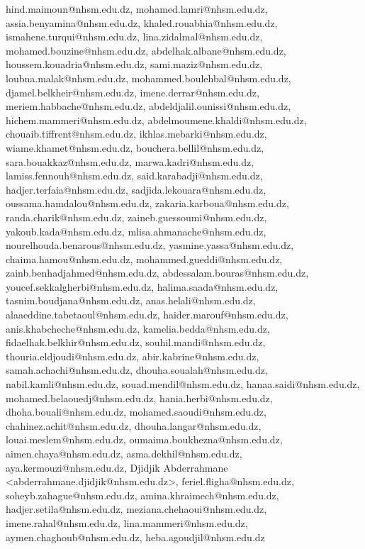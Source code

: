 hind.maimoun@nhsm.edu.dz,
mohamed.lamri@nhsm.edu.dz,
assia.benyamina@nhsm.edu.dz,
khaled.rouabhia@nhsm.edu.dz,
ismahene.turqui@nhsm.edu.dz,
lina.zidalmal@nhsm.edu.dz,
mohamed.bouzine@nhsm.edu.dz,
abdelhak.albane@nhsm.edu.dz,
houssem.kouadria@nhsm.edu.dz,
sami.maziz@nhsm.edu.dz,
loubna.malak@nhsm.edu.dz,
mohammed.boulehbal@nhsm.edu.dz,
djamel.belkheir@nhsm.edu.dz,
imene.derrar@nhsm.edu.dz,
meriem.habbache@nhsm.edu.dz,
abdeldjalil.ounissi@nhsm.edu.dz,
hichem.mammeri@nhsm.edu.dz,
abdelmoumene.khaldi@nhsm.edu.dz,
chouaib.tiffrent@nhsm.edu.dz,
ikhlas.mebarki@nhsm.edu.dz,
wiame.khamet@nhsm.edu.dz,
bouchera.bellil@nhsm.edu.dz,
sara.bouakkaz@nhsm.edu.dz,
marwa.kadri@nhsm.edu.dz,
lamiss.fennouh@nhsm.edu.dz,
said.karabadji@nhsm.edu.dz,
hadjer.terfaia@nhsm.edu.dz,
sadjida.lekouara@nhsm.edu.dz,
oussama.hamdalou@nhsm.edu.dz,
zakaria.karboua@nhsm.edu.dz,
randa.charik@nhsm.edu.dz,
zaineb.guessoumi@nhsm.edu.dz,
yakoub.kada@nhsm.edu.dz,
mlisa.ahmanache@nhsm.edu.dz,
nourelhouda.benarous@nhsm.edu.dz,
yasmine.yassa@nhsm.edu.dz,
chaima.hamou@nhsm.edu.dz,
mohammed.gueddi@nhsm.edu.dz,
zainb.benhadjahmed@nhsm.edu.dz,
abdessalam.bouras@nhsm.edu.dz,
youcef.sekkalgherbi@nhsm.edu.dz,
halima.saada@nhsm.edu.dz,
tasnim.boudjana@nhsm.edu.dz,
anas.helali@nhsm.edu.dz,
alaaeddine.tabetaoul@nhsm.edu.dz,
haider.marouf@nhsm.edu.dz,
anis.khabcheche@nhsm.edu.dz,
kamelia.bedda@nhsm.edu.dz,
fidaelhak.belkhir@nhsm.edu.dz,
souhil.mandi@nhsm.edu.dz,
thouria.eldjoudi@nhsm.edu.dz,
abir.kabrine@nhsm.edu.dz,
samah.achachi@nhsm.edu.dz,
dhouha.soualah@nhsm.edu.dz,
nabil.kamli@nhsm.edu.dz,
souad.mendil@nhsm.edu.dz,
hanaa.saidi@nhsm.edu.dz,
mohamed.belaouedj@nhsm.edu.dz,
hania.herbi@nhsm.edu.dz,
dhoha.bouali@nhsm.edu.dz,
mohamed.saoudi@nhsm.edu.dz,
chahinez.achit@nhsm.edu.dz,
dhouha.langar@nhsm.edu.dz,
louai.meslem@nhsm.edu.dz,
oumaima.boukhezna@nhsm.edu.dz,
aimen.chaya@nhsm.edu.dz,
asma.dekhil@nhsm.edu.dz,
aya.kermouzi@nhsm.edu.dz,
Djidjik Abderrahmane <abderrahmane.djidjik@nhsm.edu.dz>,
feriel.fligha@nhsm.edu.dz,
soheyb.zahague@nhsm.edu.dz,
amina.khraimech@nhsm.edu.dz,
hadjer.setila@nhsm.edu.dz,
meziana.chehaoui@nhsm.edu.dz,
imene.rahal@nhsm.edu.dz,
lina.mammeri@nhsm.edu.dz,
aymen.chaghoub@nhsm.edu.dz,
heba.agoudjil@nhsm.edu.dz